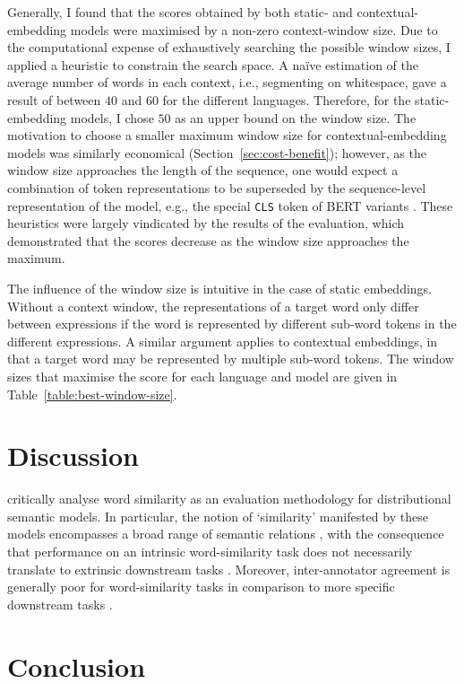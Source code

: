 Generally, I found that the scores obtained by both static- and contextual-embedding
models were maximised by a non-zero context-window size.
Due to the computational expense of exhaustively searching the possible window sizes,
I applied a heuristic to constrain the search space.
A naïve estimation of the average number of words in each context, i.e., segmenting on
whitespace, gave a result of between $40$ and $60$ for the different languages.
Therefore, for the static-embedding models, I chose $50$ as an upper bound on the
window size.
The motivation to choose a smaller maximum window size for contextual-embedding models
was similarly economical (Section~\ref{sec:cost-benefit}); however, as the window size
approaches the length of the sequence, one would expect a combination of token
representations to be superseded by the sequence-level representation of the model,
e.g., the special \texttt{CLS} token of BERT variants \parencite[4174]{Devlin2019}.
These heuristics were largely vindicated by the results of the evaluation, which
demonstrated that the scores decrease as the window size approaches the maximum.

The influence of the window size is intuitive in the case of static embeddings.
Without a context window, the representations of a target word only differ between
expressions if the word is represented by different sub-word tokens in the different
expressions.
A similar argument applies to contextual embeddings, in that a target word may be
represented by multiple sub-word tokens.
The window sizes that maximise the score for each language and model are given in
Table~\ref{table:best-window-size}.

\section{Discussion}

\textcite{Batchkarov2016} critically analyse word similarity as an evaluation
methodology for distributional semantic models.
In particular, the notion of `similarity' manifested by these models encompasses a
broad range of semantic relations \parencite[e.g.,][2]{Pado2003}, with the consequence
that performance on an intrinsic word-similarity task does not necessarily translate
to extrinsic downstream tasks \parencite[7-8]{Batchkarov2016}.
Moreover, inter-annotator agreement is generally poor for word-similarity tasks in
comparison to more specific downstream tasks \parencite[8-9]{Batchkarov2016}.

\section{Conclusion}

